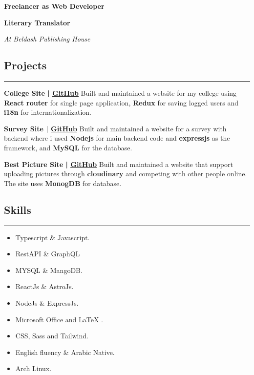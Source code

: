 \documentclass[12pt, a4paper]{article}
\begin{document}
   \textbf{Freelancer as Web Developer}\medbreak

   \textbf{Literary Translator}

   \textit{At Beldash Publishing House}\smallbreak


\subsection*{Projects}
\vspace{-0.4em}
\hrule\bigbreak


\textbf{College Site | \underline{\href{https://english-section.netlify.app/}{GitHub}}}\smallbreak
Built and maintained a website for my college using \textbf{React router} for single page
application, \textbf{Redux} for saving logged users and 
\textbf{i18n} for internationalization.\bigbreak

\textbf{Survey Site | \underline{\href{https://sos-10-survey.netlify.app/}{GitHub}}}\smallbreak
Built and maintained a website for a survey with backend where i used \textbf{Nodejs} for
main backend code and \textbf{expressjs} as the framework, and \textbf{MySQL} for the 
database.\bigbreak

\textbf{Best Picture Site | \underline{\href{https://best-pic.netlify.app/}{GitHub}}}\smallbreak
Built and maintained a website that support uploading pictures through \textbf{cloudinary} and
competing with other people online. The site uses \textbf{MonogDB} for database.


\subsection*{Skills}
\vspace{-0.4em}
\hrule

\begin{multicols}{2} %
    \begin{itemize}[noitemsep,topsep=0pt]
        \item Typescript \& Javascript.
        \item RestAPI \& GraphQL 
        \item MYSQL \& MangoDB.
        \item ReactJs \& AstroJs.
        \item NodeJs \& ExpressJs.
        \item Microsoft Office and LaTeX .
        \item CSS, Sass and Tailwind.
        \item English fluency \& Arabic Native.
        \item Arch Linux.
    \end{itemize}
\end{multicols}
  
\end{document}
